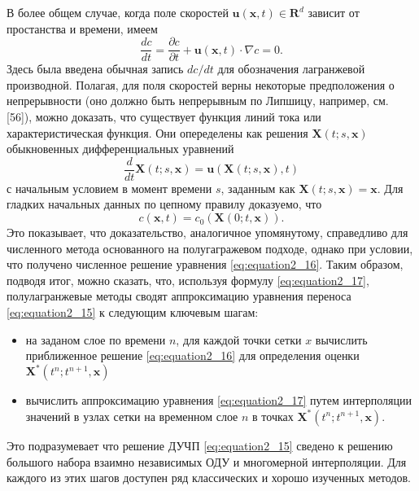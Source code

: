 В более общем случае, когда поле скоростей $\mathbf{u} (\mathbf{x},t)\in\mathbf{R}^d$ зависит от простанства и времени, имеем
%
\begin{equation}
\label{eq:equation2_15}
\frac{dc}{dt}=\frac{\partial{c}}{\partial{t}} + \mathbf{u}(\mathbf{x}, t) \cdot \nabla c = 0.
\end{equation}
%
Здесь была введена обычная запись $dc/dt$ для обозначения лагранжевой производной. Полагая, для поля скоростей верны некоторые предположения о непрерывности (оно должно быть непрерывным по Липшицу, например, см. [56]), можно доказать, что существует функция линий тока или характеристическая функция. Они опеределены как решения $\mathbf{X}(t;s, \mathbf{x})$ обыкновенных дифференциальных уравнений
%
\begin{equation}
\label{eq:equation2_16}
\frac{d}{dt}\mathbf{X}(t;s,\mathbf{x})=\mathbf{u}(\mathbf{X}(t; s, \mathbf{x}), t)
\end{equation}
%
с начальным условием в момент времени $s$, заданным как $\mathbf{X}(t;s,\mathbf{x})=\mathbf{x}$. Для гладких начальных данных по цепному правилу доказуемо, что
%
\begin{equation}
\label{eq:equation2_17}
c(\mathbf{x}, t) = c_0(\mathbf{X}(0;t,\mathbf{x})).
\end{equation}
%
Это показывает, что доказательство, аналогичное упомянутому, справедливо для численного метода основанного на полугагражевом подходе, однако при условии, что получено численное решение уравнения \eqref{eq:equation2_16}. Таким образом, подводя итог, можно сказать, что, используя формулу \eqref{eq:equation2_17}, полулагранжевые методы сводят аппроксимацию уравнения переноса \eqref{eq:equation2_15} к следующим ключевым шагам:
\begin{itemize}
	\item на заданом слое по времени $n$, для каждой точки сетки $x$ вычислить приближенное решение \eqref{eq:equation2_16} для определения оценки $\mathbf{X}^*(t^n;t^{n+1}, \mathbf{x})$
	\item вычислить аппроксимацию уравнения \eqref{eq:equation2_17} путем интерполяции значений в узлах сетки на временном слое $n$ в точках $\mathbf{X}^*(t^n;t^{n+1}, \mathbf{x})$.
\end{itemize}
Это подразумевает что решение ДУЧП \eqref{eq:equation2_15} сведено к решению большого набора взаимно независимых ОДУ и многомерной интерполяции. Для каждого из этих шагов доступен ряд классических и хорошо изученных методов.
\newpage

